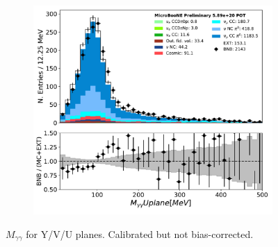 \begin{figure}[H]
\begin{center}
\begin{subfigure}[b]{0.3\textwidth}
    \caption{}
    \end{subfigure}
    \begin{subfigure}[b]{0.3\textwidth}
    \centering
    \includegraphics[width=1.00\textwidth]{pi0/calorimetry/pi0_mass_U_03112020_ALL_scaled.pdf}
    \caption{}
    \end{subfigure}
\caption{$M_{\gamma\gamma}$ for Y/V/U planes. Calibrated but not bias-corrected.}
\label{fig:pi0:calorimetry:mass}
\end{center}
\end{figure}

